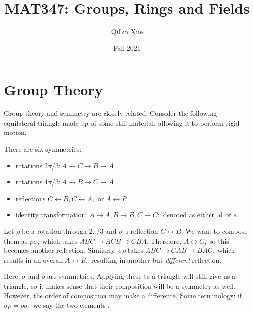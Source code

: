\documentclass{article}
\title{MAT347: Groups, Rings and Fields}
\author{QiLin Xue}
\date{Fall 2021}
\numberwithin{equation}{section}
\begin{document}
\maketitle
\tableofcontents
\newpage
\section{Group Theory}
Group theory and symmetry are closely related. Consider the following equilateral triangle made up of some stiff material, allowing it to perform rigid motion.
\begin{center}
\end{center}
There are six symmetries:
\begin{itemize}
    \item rotations $2\pi/3: A\to C\to B\to A$
    \item rotations $4\pi/3: A\to B\to C\to A$
    \item reflections $C\leftrightarrow B, C\leftrightarrow A,$ or $A\leftrightarrow B$
    \item identity transformation: $A\to A, B\to B, C\to C:$ denoted as either $\text{id}$ or $e.$
\end{itemize}
Let $\rho$ be a rotation through $2\pi/3$ and $\sigma$ a reflection $C \leftrightarrow B.$ We want to compose them as $\rho \sigma,$ which takes $ABC\to ACB \to CBA.$ Therefore, $A \leftrightarrow C,$ so this becomes another reflection. Similarly, $\sigma\rho$ takes $ABC \to CAB \to BAC,$ which results in an overall $A\leftrightarrow B,$ resulting in another but \textit{different} reflection.

Here, $\sigma$ and $\rho$ are symmetries. Applying these to a triangle will still give us a triangle, so it makes sense that their composition will be a symmetry as well. However, the order of composition may make a difference. Some terminology: if $\sigma\rho = \rho\sigma,$ we say the two elements .
\end{document}
